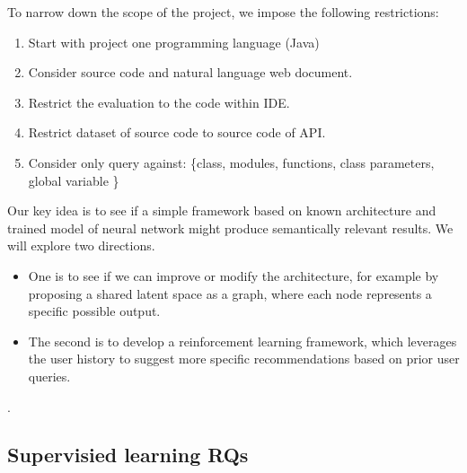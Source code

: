 \documentclass{article}
\begin{document}
\begin{multicols}{2}
To narrow down the scope of the project, we impose the following restrictions:

\begin{enumerate}
    \item Start with project one programming language (Java)
    \item Consider source code and natural language web document.
    \item Restrict the evaluation to the code within IDE.
    \item Restrict dataset of source code to source code of API.
    \item Consider only query against:
    \{class, modules, functions, class parameters, global variable \}
\end{enumerate}
Our key idea is to see if a simple framework based on known architecture and trained model of neural network might produce semantically relevant results. We will explore two directions. 

\begin{itemize}
    \item One is to see if we can improve or modify the architecture, for example by proposing a shared latent space as a graph, where each node represents a specific possible output.
    \item The second is to develop a reinforcement learning framework, which leverages the user history to suggest more specific recommendations based on prior user queries.
\end{itemize}.

\subsection{Supervisied learning RQs}


\end{multicols}
\end{document}
